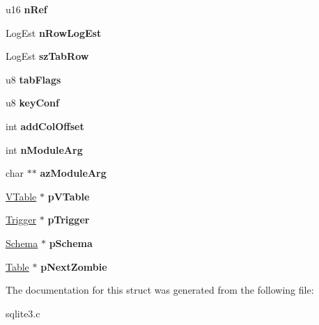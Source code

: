 \begin{DoxyCompactItemize}
\item 
u16 {\bfseries n\+Ref}\hypertarget{structTable_a5c3d59f52186917d412d42e008dd302c}{}\label{structTable_a5c3d59f52186917d412d42e008dd302c}

\item 
Log\+Est {\bfseries n\+Row\+Log\+Est}\hypertarget{structTable_ae3835f1c227f6f14ec412d04fae854aa}{}\label{structTable_ae3835f1c227f6f14ec412d04fae854aa}

\item 
Log\+Est {\bfseries sz\+Tab\+Row}\hypertarget{structTable_a141c547347c585b17f9ca2664967ab75}{}\label{structTable_a141c547347c585b17f9ca2664967ab75}

\item 
u8 {\bfseries tab\+Flags}\hypertarget{structTable_ab0aeb112ae7e1b81e2a18bc493f7992c}{}\label{structTable_ab0aeb112ae7e1b81e2a18bc493f7992c}

\item 
u8 {\bfseries key\+Conf}\hypertarget{structTable_add1b22425db781d976d25b4465a2965a}{}\label{structTable_add1b22425db781d976d25b4465a2965a}

\item 
int {\bfseries add\+Col\+Offset}\hypertarget{structTable_ab6f1ad10bce5c20faca55cd0a9c3f1ff}{}\label{structTable_ab6f1ad10bce5c20faca55cd0a9c3f1ff}

\item 
int {\bfseries n\+Module\+Arg}\hypertarget{structTable_a74a2c5547ea876ebe77dbea0d99361bf}{}\label{structTable_a74a2c5547ea876ebe77dbea0d99361bf}

\item 
char $\ast$$\ast$ {\bfseries az\+Module\+Arg}\hypertarget{structTable_af3af6596efa41894bcd3c3c9f9b6781f}{}\label{structTable_af3af6596efa41894bcd3c3c9f9b6781f}

\item 
\hyperlink{structVTable}{V\+Table} $\ast$ {\bfseries p\+V\+Table}\hypertarget{structTable_a7b9903cfbfefe7b8bf872c4f50cb2e95}{}\label{structTable_a7b9903cfbfefe7b8bf872c4f50cb2e95}

\item 
\hyperlink{structTrigger}{Trigger} $\ast$ {\bfseries p\+Trigger}\hypertarget{structTable_aca61c40bb0164f2c6fc3406c28988660}{}\label{structTable_aca61c40bb0164f2c6fc3406c28988660}

\item 
\hyperlink{structSchema}{Schema} $\ast$ {\bfseries p\+Schema}\hypertarget{structTable_a1d6ce038a061722cebaeba0f3ffceacf}{}\label{structTable_a1d6ce038a061722cebaeba0f3ffceacf}

\item 
\hyperlink{structTable}{Table} $\ast$ {\bfseries p\+Next\+Zombie}\hypertarget{structTable_ae365eb0d8f6d3cb39f3908323cba45e4}{}\label{structTable_ae365eb0d8f6d3cb39f3908323cba45e4}

\end{DoxyCompactItemize}


The documentation for this struct was generated from the following file\+:\begin{DoxyCompactItemize}
\item 
sqlite3.\+c\end{DoxyCompactItemize}
